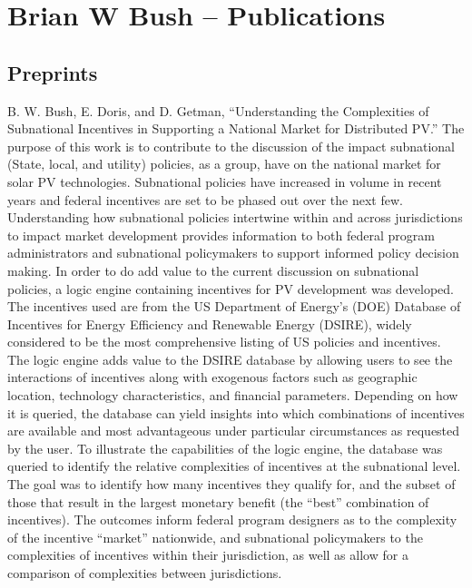 \documentclass[]{article}
\begin{document}
\section{Brian W Bush -- Publications}\label{brian-w-bush-publications}

\subsection{Preprints}\label{preprints}

B. W. Bush, E. Doris, and D. Getman, ``Understanding the Complexities of
Subnational Incentives in Supporting a National Market for Distributed
PV.'' The purpose of this work is to contribute to the discussion of the
impact subnational (State, local, and utility) policies, as a group,
have on the national market for solar PV technologies. Subnational
policies have increased in volume in recent years and federal incentives
are set to be phased out over the next few. Understanding how
subnational policies intertwine within and across jurisdictions to
impact market development provides information to both federal program
administrators and subnational policymakers to support informed policy
decision making. In order to do add value to the current discussion on
subnational policies, a logic engine containing incentives for PV
development was developed. The incentives used are from the US
Department of Energy's (DOE) Database of Incentives for Energy
Efficiency and Renewable Energy (DSIRE), widely considered to be the
most comprehensive listing of US policies and incentives. The logic
engine adds value to the DSIRE database by allowing users to see the
interactions of incentives along with exogenous factors such as
geographic location, technology characteristics, and financial
parameters. Depending on how it is queried, the database can yield
insights into which combinations of incentives are available and most
advantageous under particular circumstances as requested by the user. To
illustrate the capabilities of the logic engine, the database was
queried to identify the relative complexities of incentives at the
subnational level. The goal was to identify how many incentives they
qualify for, and the subset of those that result in the largest monetary
benefit (the ``best'' combination of incentives). The outcomes inform
federal program designers as to the complexity of the incentive
``market'' nationwide, and subnational policymakers to the complexities
of incentives within their jurisdiction, as well as allow for a
comparison of complexities between jurisdictions.
\end{document}
